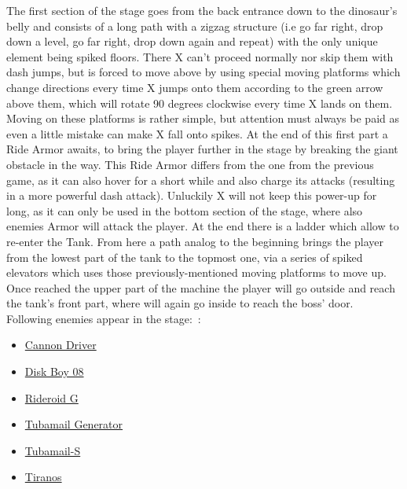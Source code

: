 The first section of the stage goes from the back entrance down to the dinosaur's belly and consists of a long path with a zigzag structure (i.e go far right, drop down a level, go far right, drop down again and repeat) with the only unique element being spiked floors. There X can't proceed normally nor skip them with dash jumps, but is forced to move above by using special moving platforms which change directions every time X jumps onto them according to the green arrow above them, which will rotate 90 degrees clockwise every time X lands on them. Moving on these platforms is rather simple, but attention must always be paid as even a little mistake can make X fall onto spikes. At the end of this first part a Ride Armor awaits, to bring the player further in the stage by breaking the giant obstacle in the way. This Ride Armor differs from the one from the previous game, as it can also hover for a short while and also charge its attacks (resulting in a more powerful dash attack). Unluckily X will not keep this power-up for long, as it can only be used in the bottom section of the stage, where also enemies Armor will attack the player. At the end there is a ladder which allow to re-enter the Tank. From here a path analog to the beginning brings the player from the lowest part of the tank to the topmost one, via a series of spiked elevators which uses those previously-mentioned moving platforms to move up. Once reached the upper part of the machine the player will go outside and reach the tank's front part, where will again go inside  to reach the boss' door.
Following enemies appear in the stage:~\cite{wiki:Dinosaur_tank}:
\begin{itemize}
	\item \hyperlink {enem:Cannon_Driver}{Cannon Driver}
	\item \hyperlink {enem:Disk_Boy_08}{Disk Boy 08}
	\item \hyperlink {enem:Rideroid G}{Rideroid G}
	\item \hyperlink {enem:Tubamail_Generator}{Tubamail Generator}
	\item \hyperlink {enem:Tubamail-S}{Tubamail-S}
	\item \hyperlink {enem:Tiranos}{Tiranos}
\end{itemize}


